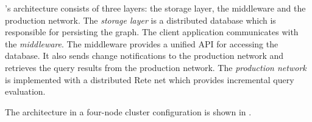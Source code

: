 \iqd{}'s architecture consists of three layers: the storage layer, the middleware and the production network. 
The \emph{storage layer} is a distributed database which is responsible for persisting the graph. 
The client application communicates with the \emph{middleware}. The middleware provides a unified API for accessing the database. It also sends change notifications to the production network and retrieves the query results from the production network. 
The \emph{production network} is implemented with a distributed Rete net which provides incremental query evaluation. 


The \iqd{} architecture in a four-node cluster configuration is shown in .
